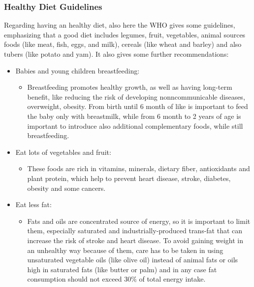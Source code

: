 \subsubsection{Healthy Diet Guidelines}
Regarding having an healthy diet, also here the WHO gives some guidelines, emphasizing that a good diet includes legumes, fruit, vegetables, animal sources foods (like meat, fish, eggs, and milk), cereals (like wheat and barley) and also tubers (like potato and yam). It also gives some further recommendations\cite{WhoHealthyDietGuidelines}: 
\vspace{3ex}
\begin{itemize}[nosep] %
    \item Babies and young children breastfeeding:\vspace{2ex}
          \begin{itemize}[nosep]
              \item Breastfeeding promotes healthy growth, as well as having long-term benefit, like reducing the risk of developing nonncommunicable diseases, overweight, obesity. From birth until 6 month of like is important to feed the baby only with breastmilk, while from 6 month to 2 years of age is important to introduce also additional complementary foods, while still breastfeeding.
          \end{itemize}
          \vspace{3ex}
    \item Eat lots of vegetables and fruit:\vspace{2ex}
          \begin{itemize}[nosep]
              \item These foods are rich in vitamins, minerals, dietary fiber, antioxidants and plant protein, which help to prevent heart disease, stroke, diabetes, obesity and some cancers.
          \end{itemize}
          \vspace{3ex}
    \item Eat less fat:\vspace{2ex}
          \begin{itemize}[nosep]
              \item Fats and oils are concentrated source of energy, so it is important to limit them, especially saturated and industrially-produced trans-fat that can increase the risk of stroke and heart disease. To avoid gaining weight in an unhealthy way because of them, care has to be taken in using unsaturated vegetable oils (like olive oil) instead of animal fats or oils high in saturated fats (like butter or palm) and in any case fat consumption should not exceed 30\% of total energy intake.

\end{itemize}
\end{itemize}
